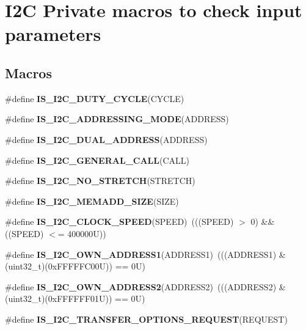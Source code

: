 \hypertarget{group___i2_c___i_s___r_t_c___definitions}{}\section{I2C Private macros to check input parameters}
\label{group___i2_c___i_s___r_t_c___definitions}
\subsection*{Macros}
\begin{DoxyCompactItemize}
\item 
\#define {\bfseries I\+S\+\_\+\+I2\+C\+\_\+\+D\+U\+T\+Y\+\_\+\+C\+Y\+C\+LE}(C\+Y\+C\+LE)
\item 
\#define {\bfseries I\+S\+\_\+\+I2\+C\+\_\+\+A\+D\+D\+R\+E\+S\+S\+I\+N\+G\+\_\+\+M\+O\+DE}(A\+D\+D\+R\+E\+SS)
\item 
\#define {\bfseries I\+S\+\_\+\+I2\+C\+\_\+\+D\+U\+A\+L\+\_\+\+A\+D\+D\+R\+E\+SS}(A\+D\+D\+R\+E\+SS)
\item 
\#define {\bfseries I\+S\+\_\+\+I2\+C\+\_\+\+G\+E\+N\+E\+R\+A\+L\+\_\+\+C\+A\+LL}(C\+A\+LL)
\item 
\#define {\bfseries I\+S\+\_\+\+I2\+C\+\_\+\+N\+O\+\_\+\+S\+T\+R\+E\+T\+CH}(S\+T\+R\+E\+T\+CH)
\item 
\#define {\bfseries I\+S\+\_\+\+I2\+C\+\_\+\+M\+E\+M\+A\+D\+D\+\_\+\+S\+I\+ZE}(S\+I\+ZE)
\item 
\mbox{\label{group___i2_c___i_s___r_t_c___definitions_gae0d731df1b264d853703716c29309b9b}} 
\#define {\bfseries I\+S\+\_\+\+I2\+C\+\_\+\+C\+L\+O\+C\+K\+\_\+\+S\+P\+E\+ED}(S\+P\+E\+ED)~(((S\+P\+E\+ED) $>$ 0) \&\& ((S\+P\+E\+ED) $<$= 400000\+U))
\item 
\mbox{\label{group___i2_c___i_s___r_t_c___definitions_gad84e8b9523d45b6105b4d5cb68994a79}} 
\#define {\bfseries I\+S\+\_\+\+I2\+C\+\_\+\+O\+W\+N\+\_\+\+A\+D\+D\+R\+E\+S\+S1}(A\+D\+D\+R\+E\+S\+S1)~(((A\+D\+D\+R\+E\+S\+S1) \& (uint32\+\_\+t)(0x\+F\+F\+F\+F\+F\+C00\+U)) == 0\+U)
\item 
\mbox{\label{group___i2_c___i_s___r_t_c___definitions_ga83001d53612b83ee90730d3bb2732537}} 
\#define {\bfseries I\+S\+\_\+\+I2\+C\+\_\+\+O\+W\+N\+\_\+\+A\+D\+D\+R\+E\+S\+S2}(A\+D\+D\+R\+E\+S\+S2)~(((A\+D\+D\+R\+E\+S\+S2) \& (uint32\+\_\+t)(0x\+F\+F\+F\+F\+F\+F01\+U)) == 0\+U)
\item 
\#define {\bfseries I\+S\+\_\+\+I2\+C\+\_\+\+T\+R\+A\+N\+S\+F\+E\+R\+\_\+\+O\+P\+T\+I\+O\+N\+S\+\_\+\+R\+E\+Q\+U\+E\+ST}(R\+E\+Q\+U\+E\+ST)
\end{DoxyCompactItemize}


